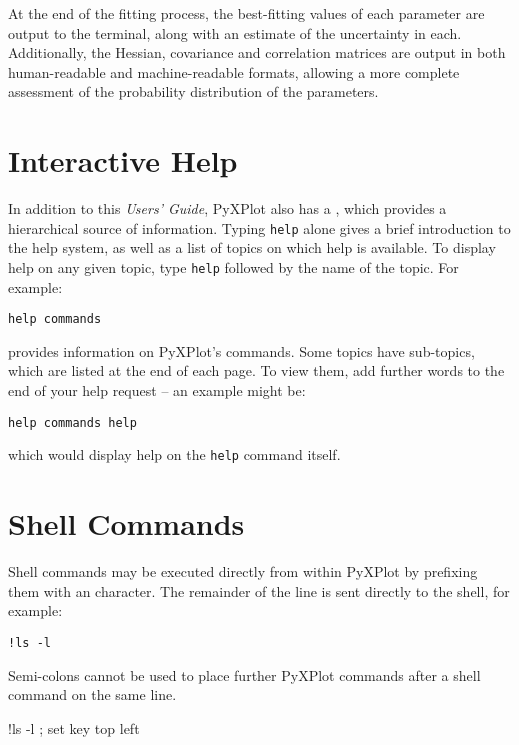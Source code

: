 At the end of the fitting process, the best-fitting values of each parameter
are output to the terminal, along with an estimate of the uncertainty in each.
Additionally, the Hessian, covariance and correlation matrices are output in
both human-readable and machine-readable formats, allowing a more complete
assessment of the probability distribution of the parameters.

\section{Interactive Help}

In addition to this {\it Users' Guide}, PyXPlot also has a ,
which provides a hierarchical source of information. Typing {\tt help} alone
gives a brief introduction to the help system, as well as a list of topics on
which help is available. To display help on any given topic, type {\tt help}
followed by the name of the topic. For example:

\begin{verbatim}
help commands
\end{verbatim}

\noindent provides information on PyXPlot's commands. Some topics have
sub-topics, which are listed at the end of each page. To view them, add further
words to the end of your help request -- an example might be:

\begin{verbatim}
help commands help
\end{verbatim}

\noindent which would display help on the {\tt help} command itself.

\section{Shell Commands}

Shell commands may be executed directly from
within PyXPlot by prefixing them with an \indcmdts{!} character. The
remainder of the line is sent directly to the shell, for example:

\begin{verbatim}
!ls -l
\end{verbatim}

\noindent Semi-colons cannot be used to place further PyXPlot commands after a
shell command on the same line.

\begin{dontdo}
!ls -l ; set key top left
\end{dontdo}

